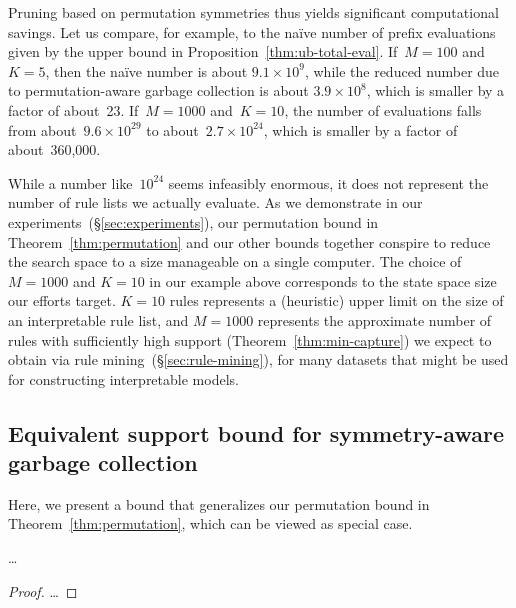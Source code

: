 Pruning based on permutation symmetries thus yields significant
computational savings.
%
Let us compare, for example, to the na\"ive number of prefix evaluations
given by the upper bound in Proposition~\ref{thm:ub-total-eval}.
%
If~${M = 100}$ and~${K = 5}$, then the na\"ive number is about
${9.1 \times 10^9}$, while the reduced number due to permutation-aware
garbage collection is about ${3.9 \times 10^8}$,
which is smaller by a factor of about~23.
%
If~${M=1000}$ and~${K = 10}$, the number of evaluations falls from
about~${9.6 \times 10^{29}}$ to about~${2.7 \times 10^{24}}$,
which is smaller by a factor of about~360,000.
%

While a number like~$10^{24}$ seems infeasibly enormous,
it does not represent the number of rule lists we actually evaluate.
%
As we demonstrate in our experiments~(\S\ref{sec:experiments}),
our permutation bound in Theorem~\ref{thm:permutation}
and our other bounds together conspire to reduce the search space
to a size manageable on a single computer.
%
The choice of ${M=1000}$ and ${K=10}$ in our example above
corresponds to the state space size our efforts target.
%
${K=10}$ rules represents a (heuristic) upper limit on
the size of an interpretable rule list,
and ${M=1000}$ represents the approximate number of rules
with sufficiently high support (Theorem~\ref{thm:min-capture})
we expect to obtain via rule mining~(\S\ref{sec:rule-mining}),
for many datasets that might be used for constructing interpretable models.

\subsection{Equivalent support bound for symmetry-aware garbage collection}

Here, we present a bound that generalizes our permutation bound in
Theorem~\ref{thm:permutation}, which can be viewed as special case.

\begin{theorem}
\dots
\end{theorem}

\begin{proof}
\dots
\end{proof}

